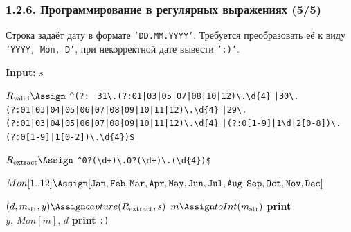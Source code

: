 \begin{frame}
\frametitle{1.2.6. Программирование в регулярных выражениях (5/5)}
\begin{example}
Строка задаёт дату в формате
\texttt{'DD.MM.YYYY'}. Требуется преобразовать её к виду \texttt{'YYYY, Mon, D'},
при некорректной дате вывести \texttt{':)'}.
\begin{algorithmic}
\STATE \textbf{Input:} $s$

\STATE $R_{\mathrm{valid}} \Assign$ \texttt{\^{}(?:}
\ \texttt{31\textbackslash.(?:01|03|05|07|08|10|12)\textbackslash.\textbackslash d\{4\}}
\STATE \quad \texttt{|30\textbackslash.(?:01|03|04|05|06|07|08|09|10|11|12)\textbackslash.\textbackslash d\{4\}}
\STATE \quad \texttt{|29\textbackslash.(?:01|03|04|05|06|07|08|09|10|11|12)\textbackslash.\textbackslash d\{4\}}
\STATE \quad \texttt{|(?:0[1-9]|1\textbackslash d|2[0-8])\textbackslash.(?:0[1-9]|1[0-2])\textbackslash.\textbackslash d\{4\}}\texttt{)\$}

\STATE $R_{\mathrm{extract}} \Assign$
\texttt{\^{}0?(\textbackslash d+)\textbackslash.0?(\textbackslash d+)\textbackslash.(\textbackslash d\{4\})\$}

\STATE $Mon[1..12] \Assign
[\texttt{Jan},\texttt{Feb},\texttt{Mar},\texttt{Apr},\texttt{May},\texttt{Jun},\texttt{Jul},\texttt{Aug},\texttt{Sep},\texttt{Oct},\texttt{Nov},\texttt{Dec}]$

    \STATE $(d, m_{\mathrm{str}}, y)\Assign capture(R_{\mathrm{extract}}, s)$
    \STATE $m\Assign toInt(m_{\mathrm{str}})$
    \STATE \textbf{print} $y\texttt{, }Mon[m]\texttt{, }d$
\ELSE
    \STATE \textbf{print} \texttt{:)}
\ENDIF
\end{algorithmic}
\end{example}
\end{frame}


